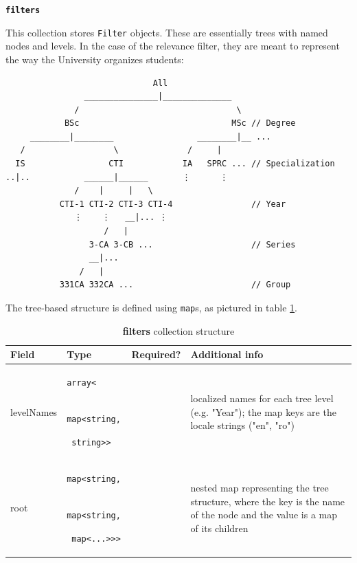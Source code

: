 \clearpage

\faDatabase \hspace{0.1cm} \textbf{\texttt{filters}}

This collection stores \texttt{Filter} objects. These are essentially trees with named nodes and levels. In the case of the relevance filter, they are meant to represent the way the University organizes students:

\begin{verbatim}
                              All
                _______________|______________
              /                                \
            BSc                               MSc // Degree
     ________|________                 ________|__ ...
   /                  \              /     |
  IS                 CTI            IA   SPRC ... // Specialization
..|..           ______|______       ⋮      ⋮
              /    |     |   \
           CTI-1 CTI-2 CTI-3 CTI-4                // Year
              ⋮    ⋮   __|... ⋮
                    /   |
                 3-CA 3-CB ...                    // Series
                 __|...
               /   |
           331CA 332CA ...                        // Group
\end{verbatim}

The tree-based structure is defined using \texttt{map}s, as pictured in table \ref{5:tab:filters}.

\begin{table}[th]\small\linespread{1}
\caption{\textbf{filters} collection structure}
\label{5:tab:filters}
\begin{tabular}{| l | p{2.6cm} | c | p{7.1cm} |}
\hline
\textbf{Field} & \textbf{Type} & \textbf{Required?} & \textbf{Additional info} \\
\hline
levelNames & \texttt{array<}

\texttt{ map<string,}

\texttt{  string>>} & \Checkedbox & localized names for each tree level (e.g. "Year"); the map keys are the locale strings ("en", "ro")
\\
\hline
root & \texttt{map<string,}

\texttt{ map<string,}

\texttt{  map<...>>>} & \Checkedbox & nested map representing the tree structure, where the key is the name of the node and the value is a map of its children
\\
\hline
\end{tabular}
\end{table}

